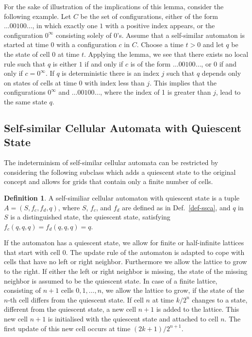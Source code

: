 \documentclass{article}
\theoremstyle{definition}
\newtheorem{defn}{Definition}
\begin{document}
For the sake of illustration of the implications of this lemma, consider the following example.
Let $C$ be the set of configurations, either of the form $\ldots00100\ldots$, in which exactly one $1$ with a positive index appears, 
or the configuration $0^\infty$ consisting solely of $0$'s.
Assume that a self-similar automaton is started at time $0$ with a configuration $c$ in $C$.
Choose a time $t > 0$ and let $q$ be the state of cell $0$ at time $t$.
Applying the lemma, we see that there exists no local rule such
that $q$ is either $1$ if and only if $c$ is of the form $\ldots00100\ldots$, or $0$ if and only if $c=0^\infty$.
If $q$ is deterministic there is an index $j$ such that 
$q$ depends only on states of cells at time $0$ with index less than $j$. 
This implies that the configurations $0^\infty$ and $\ldots00100\ldots$, where the index of 1 is greater than $j$,
lead to the same state $q$.

\subsection{Self-similar Cellular Automata with Quiescent State}

The indeterminism of self-similar cellular automata can be restricted by considering the following subclass
which adds a quiescent state to the original concept and allows for grids
that contain only a finite number of cells.

\begin{defn}
A self-similiar cellular automaton with quiescent state is a tuple $A = (S, f_c, f_d, q)$, where
$S$, $f_c$, and $f_d$ are defined as in Def.~\ref{def-ssca}, and
$q$ in $S$ is a distinguished state, the quiescent state,
satisfying $f_c(q,q,q) = f_d(q,q,q) = q$.
\end{defn}

If the automaton has a quiescent state, we allow for finite or half-infinite lattices that start with cell $0$.
The update rule of the automaton is adapted to cope with cells that have no left or right neighbor.
Furthermore we allow the lattice to grow to the right.
If either the left or right neighbor is missing, the state of the missing neighbor is assumed to be the quiescent state.
In case of a finite lattice, consisting of $n+1$ cells $0, 1, \ldots, n$, we allow the lattice to grow,
if the state of the $n$-th cell differs from the quiescent state.
If cell $n$ at time $k / 2^n$ changes to a state, different from the quiescent state, a new cell $n+1$ is added to
the lattice.
This new cell $n+1$ is initialised with the quiescent state and attached to cell $n$.
The first update of this new cell occurs at time $(2k+1) / 2^{n+1}$.
\end{document}
